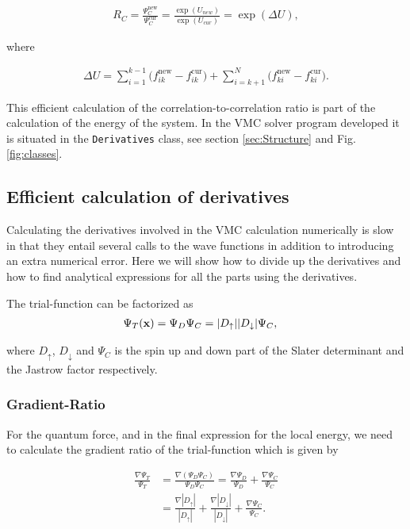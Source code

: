 		\begin{align}
			R_{C}=\frac{\Psi_{C}^{\mathrm{new}}}{\Psi_{C}^{\mathrm{cur}}}=\frac{\exp\left(U_{new}\right)}{\exp\left(U_{cur}\right)}=\exp\left(\Delta U\right),
		\end{align}

		where

		\begin{align}
			\Delta U =
			\sum_{i=1}^{k-1}\big(f_{ik}^\mathrm{new}-f_{ik}^\mathrm{cur}\big)
			+
			\sum_{i=k+1}^{N}\big(f_{ki}^\mathrm{new}-f_{ki}^\mathrm{cur}\big).
		\end{align}

		This efficient calculation of the correlation-to-correlation ratio is part of the calculation of the energy of the system. In the VMC solver program developed it is situated in the {\tt Derivatives} class, see section \ref{sec:Structure} and Fig. \ref{fig:classes}.


	\subsection{Efficient calculation of derivatives}
		Calculating the derivatives involved in the VMC calculation numerically is slow in that they entail several calls to the wave functions in addition to introducing an extra numerical error. Here we will show how to divide up the derivatives and how to find analytical expressions for all the parts using the derivatives.

		The trial-function can be factorized as
		\begin{align}
			\Psi_T(\vb{x}) &= \Psi_{D} \Psi_C= |D_\uparrow| |D_\downarrow| \Psi_C \label{eq:factorization},
		\end{align}

		where \(D_\uparrow\), \(D_\downarrow\) and \(\Psi_C\) is the spin up and down part of the Slater determinant and the Jastrow factor respectively.

		\subsubsection{Gradient-Ratio}
			For the quantum force, and in the final expression for the local energy, we need to calculate the gradient ratio of the trial-function which is given by

			\begin{align}
				\frac{\nabla \Psi_T}{ \Psi_T } &= \frac{\nabla( \Psi_D\Psi_C  )}{ \Psi_D\Psi_C } = \frac{ \nabla \Psi_D }{\Psi_D } + \frac{\nabla \Psi_C}{\Psi_C}
				\\
				&= \frac{\nabla |D_\uparrow|}{|D_\uparrow|} + \frac{ \nabla |D_\downarrow|}{|D_\downarrow|} + \frac{\nabla \Psi_C}{\Psi_C}.
			\end{align}	

